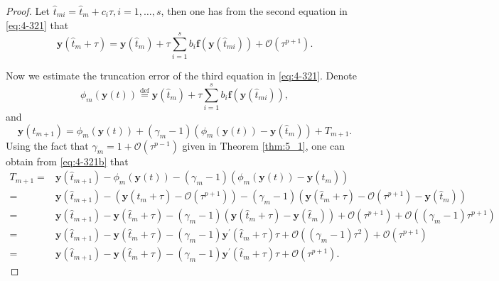 \documentclass[preprint,compress,3p,10pt,fleqn]{elsarticle}
\numberwithin{equation}{section}
\begin{document}
\begin{proof}
Let $\hat{t}_{m i}=\hat{t}_m+c_i\tau, i=1, \ldots, s$,
then one has from the second equation in \eqref{eq:4-321} that
\begin{equation}\label{eq:4-321b}
\bm{y}\left(\hat{t}_m+\tau\right)=\bm{y}\left(\hat{t}_m\right)+\tau \sum_{i=1}^s b_i \bm{f}\left(\bm{y}\left(\hat{t}_{m i}\right)\right)+\mathcal{O}\left(\tau^{p+1}\right).
\end{equation}

Now we estimate the truncation error of the third equation in \eqref{eq:4-321}.
Denote
$$\phi_m(\bm{y}(t))\overset{\text{def}}{=}\bm{y}\left(\hat{t}_m\right)+\tau \sum\limits_{i=1}^s b_i \bm{f}\left(\bm{y}\left(\hat{t}_{m i}\right)\right),$$
and
\begin{equation}
\bm{y}\left(\hat{t}_{m+1}\right)=\phi_m(\bm{y}(t))+\left(\gamma_m-1\right)\left(\phi_m(\bm{y}(t))-\bm{y}\left(\hat{t}_m\right)\right)+T_{m+1} .
\end{equation}
Using the fact that $\gamma_m=1+\mathcal{O}\left(\tau^{p-1}\right)$ given in Theorem \ref{thm:5_1},
one can obtain from \eqref{eq:4-321b} that
\begin{equation}
\begin{aligned}
T_{m+1}= & \bm{y}\left(\hat{t}_{m+1}\right)-\phi_m(\bm{y}(t))-\left(\gamma_m-1\right)\left(\phi_m(\bm{y}(t))-\bm{y}\left(\hat{t}_m\right)\right) \\
= & \bm{y}\left(\hat{t}_{m+1}\right)-\left(\bm{y}\left(\hat{t}_m+\tau\right)-\mathcal{O}(\tau^{p+1})\right)-\left(\gamma_m-1\right)\left(\bm{y}\left(\hat{t}_m+\tau\right)-\mathcal{O}(\tau^{p+1})-\bm{y}\left(\hat{t}_m\right)\right) \\
= & \bm{y}\left(\hat{t}_{m+1}\right)-\bm{y}\left(\hat{t}_m+\tau\right)-\left(\gamma_m-1\right)\left(\bm{y}\left(\hat{t}_m+\tau\right)-\bm{y}\left(\hat{t}_m\right)\right)+\mathcal{O}(\tau^{p+1})+\mathcal{O}((\gamma_m-1) \tau^{p+1}) \\
= & \bm{y}\left(\hat{t}_{m+1}\right)-\bm{y}\left(\hat{t}_m+\tau\right)-\left(\gamma_m-1\right) \bm{y}^{\prime}\left(\hat{t}_m+\tau\right) \tau+\mathcal{O}((\gamma_m-1) \tau^2)+\mathcal{O}(\tau^{p+1}) \\
= & \bm{y}\left(\hat{t}_{m+1}\right)-\bm{y}\left(\hat{t}_m+\tau\right)-\left(\gamma_m-1\right) \bm{y}^{\prime}\left(\hat{t}_m+\tau\right) \tau+\mathcal{O}(\tau^{p+1}) .
\end{aligned}
\end{equation}


\end{proof}
\end{document}
